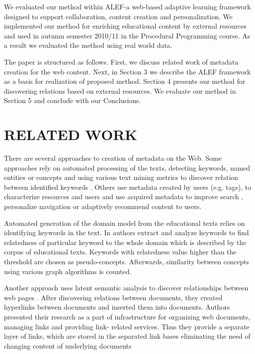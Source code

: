 \documentclass[a4, conference]{IEEEtran}
\begin{document}
We evaluated our method within ALEF-a web-based adaptive learning framework designed to support collaboration, content creation and personalization. We implemented our method for enriching educational content by external resources and used in autumn semester 2010/11 in the Procedural Programming course. As a result we evaluated the method using real world data.

The paper is structured as follows. First, we discuss related work of metadata creation for the web content. Next, in Section 3 we describe the ALEF framework as a basis for realization of proposed method. Section 4 presents our method for discovering relations based on external resources. We evaluate our method in Section 5 and conclude with our Conclusions. 
\section{RELATED WORK}%
%
There are several approaches to creation of metadata on the Web. Some approaches rely on automated processing of the texts, detecting keywords, named entities or concepts and using various text mining metrics to discover relation between identified keywords \cite{ref:vsimko2011supporting }. Others use metadata created by users (e.g. tags), to characterize resources and users \cite{ref:hunter2008harvana } and use acquired metadata to improve search \cite{ref:bao2007optimizing }, personalize navigation \cite{ref:farzan2008annotated }or adaptively recommend content \cite{ref:shepitsen2008personalized } to users.

Automated generation of the domain model from the educational texts relies on identifying keywords in the text. In \cite{ref:vsimko2011supporting } authors extract and analyze keywords to find relatedness of particular keyword to the whole domain which is described by the corpus of educational texts. Keywords with relatedness value higher than the threshold are chosen as pseudo-concepts. Afterwards, similarity between concepts using various graph algorithms is counted.

Another approach uses latent semantic analysis to discover relationships between web pages \cite{ref:macedo2002infrastructure }. After discovering relations between documents, they created hyperlinks between documents and inserted them into documents. Authors presented their research as a part of infrastructure for organizing web documents, managing links and providing link- related services. Thus they provide a separate layer of links, which are stored in the separated link bases eliminating the need of changing content of underlying documents
\end{document}
